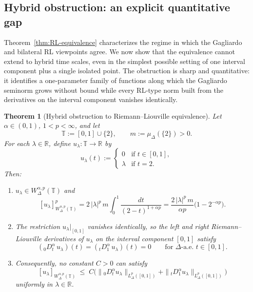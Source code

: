 \documentclass[11pt,a4paper]{article}
\numberwithin{equation}{section}
\newtheorem{theorem}{Theorem}[section]
\theoremstyle{definition}
\newcommand{\R}{\mathbb{R}}
\newcommand{\T}{\mathbb{T}}
\begin{document}
\subsection{Hybrid obstruction: an explicit quantitative gap}\label{subsec:hybrid-obstruction}

Theorem~\ref{thm:RL-equivalence} characterizes the regime in which the
Gagliardo and bilateral RL viewpoints agree. We now show that the
equivalence cannot extend to hybrid time scales, even in the
simplest possible setting of one interval component plus a single
isolated point. The obstruction is sharp and quantitative: it
identifies a one-parameter family of functions along which the
Gagliardo seminorm grows without bound while every RL-type norm built
from the derivatives on the interval component vanishes identically.

\begin{theorem}[Hybrid obstruction to Riemann--Liouville equivalence]\label{thm:hybrid-obstruction}
Let $\alpha \in (0,1)$, $1 < p < \infty$, and let
\[
\T := [0,1] \cup \{2\}, \qquad m := \mu_\Delta(\{2\}) > 0.
\]
For each $\lambda \in \R$, define $u_\lambda : \T \to \R$ by
\[
u_\lambda(t) :=
\begin{cases}
0 & \text{if } t \in [0,1], \\
\lambda & \text{if } t = 2.
\end{cases}
\]
Then:
\begin{enumerate}
\item[(i)] $u_\lambda \in W^{\alpha,p}_\Delta(\T)$ and
\[
[u_\lambda]^p_{W^{\alpha,p}_\Delta(\T)}
= 2 \, |\lambda|^p \, m \int_0^1 \frac{dt}{(2 - t)^{1+\alpha p}}
= \frac{2 \, |\lambda|^p \, m}{\alpha p} \bigl( 1 - 2^{-\alpha p} \bigr).
\]
\item[(ii)] The restriction $u_\lambda|_{[0,1]}$ vanishes identically,
so the left and right Riemann--Liouville derivatives of $u_\lambda$ on
the interval component $[0,1]$ satisfy
\[
({}_0 D^\alpha_t \, u_\lambda)(t) = ({}_t D^\alpha_1 \, u_\lambda)(t) = 0
\qquad \text{for $\Delta$-a.e.\ } t \in [0,1].
\]
\item[(iii)] Consequently, no constant $C > 0$ can satisfy
\[
[u_\lambda]_{W^{\alpha,p}_\Delta(\T)}
\;\le\; C \bigl( \|{}_0 D^\alpha_t u_\lambda\|_{L^p_\Delta([0,1])}
              + \|{}_t D^\alpha_1 u_\lambda\|_{L^p_\Delta([0,1])} \bigr)
\]
uniformly in $\lambda \in \R$.
\end{enumerate}
\end{theorem}
\end{document}
